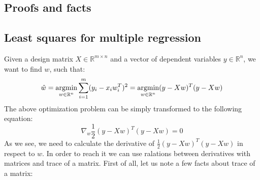 \begin{appendices}

\chapter{Proofs and facts}

\section{Least squares for multiple regression}
\label{app:least}

Given a design matrix $X \in \mathbb{R}^{m \times n}$ and a vector of dependent variables $y \in \mathbb{R}^{n}$, we want to find $w$, such that:
\begin{equation}
    \hat{w} = \operatorname*{argmin}_{w \in \mathbb{R}^{n}}\sum\limits_{i=1}^{m}(y_i-x_iw^T_i)^2 = \operatorname*{argmin}_{w \in \mathbb{R}^{n}}(y-Xw)^T(y-Xw)
\end{equation}
The above optimization problem can be simply transformed to the following equation:
\begin{equation}\label{eq:least1}
    \nabla_w \frac{1}{2}(y-Xw)^T(y-Xw) = 0
\end{equation}
As we see, we need to calculate the derivative of $\frac{1}{2}(y-Xw)^T(y-Xw)$ in respect to $w$. In order to reach it we can use ralations between derivatives with matrices and trace of a matrix. First of all, let us note a few facts about trace of a matrix:


\end{appendices}
